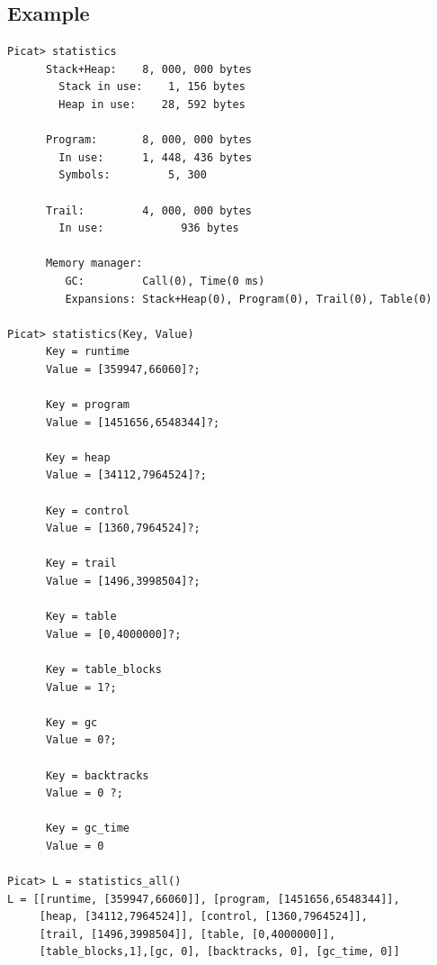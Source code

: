 \subsection*{Example}
\begin{verbatim}
Picat> statistics
      Stack+Heap:    8, 000, 000 bytes
        Stack in use:    1, 156 bytes
        Heap in use:    28, 592 bytes
      
      Program:       8, 000, 000 bytes
        In use:      1, 448, 436 bytes
        Symbols:         5, 300
      
      Trail:         4, 000, 000 bytes
        In use:            936 bytes
      
      Memory manager:
         GC:         Call(0), Time(0 ms)
         Expansions: Stack+Heap(0), Program(0), Trail(0), Table(0)

Picat> statistics(Key, Value)
      Key = runtime
      Value = [359947,66060]?;

      Key = program
      Value = [1451656,6548344]?;

      Key = heap
      Value = [34112,7964524]?;

      Key = control
      Value = [1360,7964524]?;

      Key = trail
      Value = [1496,3998504]?;

      Key = table
      Value = [0,4000000]?;

      Key = table_blocks
      Value = 1?;

      Key = gc
      Value = 0?;

      Key = backtracks
      Value = 0 ?;

      Key = gc_time
      Value = 0 

Picat> L = statistics_all()
L = [[runtime, [359947,66060]], [program, [1451656,6548344]], 
     [heap, [34112,7964524]], [control, [1360,7964524]], 
     [trail, [1496,3998504]], [table, [0,4000000]], 
     [table_blocks,1],[gc, 0], [backtracks, 0], [gc_time, 0]]
\end{verbatim}

